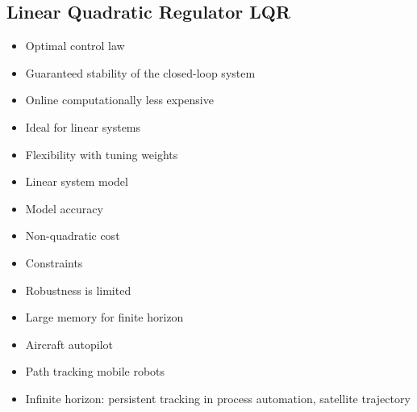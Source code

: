 \begin{mdframed}[backgroundcolor=red!20, frametitlerulewidth=0pt, innertopmargin=-2mm, innerbottommargin=2mm, skipabove=0mm]

\section{Linear Quadratic Regulator LQR}
\end{mdframed}
\begin{minipage}{0.33\textwidth}
    \begin{tcolorbox}[colframe=green!50!black, colback=green!5!white, title=Pros, left=0.5mm, right=0.5mm]
    \begin{itemize}[leftmargin=*]
        \item Optimal control law
        \item Guaranteed stability of the closed-loop system
        \item Online computationally less expensive 
        \item Ideal for linear systems
        \item Flexibility with tuning weights
    \end{itemize}
    \end{tcolorbox}
\end{minipage}
\begin{minipage}{0.33\textwidth}
    \begin{tcolorbox}[colframe=red!50!black, colback=red!5!white, title=Cons, left=0.5mm, right=0.5mm]
    \begin{itemize}[leftmargin=*]
        \item Linear system model 
        \item Model accuracy 
        \item Non-quadratic cost
        \item Constraints 
        \item Robustness is limited
        \item Large memory for finite horizon
    \end{itemize}
    \end{tcolorbox}
\end{minipage}
\begin{minipage}{0.33\textwidth}
    \begin{tcolorbox}[colframe=gray!50!black, colback=gray!5!white, title=Examples, left=0.5mm, right=0.5mm]
    \begin{itemize}[leftmargin=*]
        \item Aircraft autopilot
        \item Path tracking mobile robots
        \item Infinite horizon: persistent tracking in process automation, satellite trajectory
    \end{itemize}
    \end{tcolorbox}
\end{minipage}\\ \\
